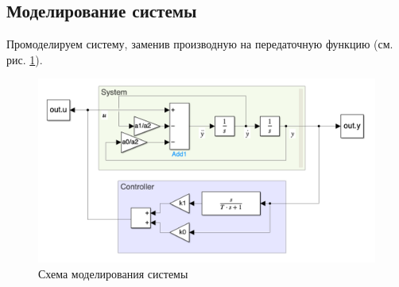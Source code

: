 \subsection{Моделирование системы}
Промоделируем систему, заменив производную на передаточную функцию (см. рис. \ref{fig:task2_scheme}).
\begin{figure}[ht!]
    \centering
    \includegraphics[width=\textwidth]{"media/scheme2.png"}
    \caption{Схема моделирования системы}
    \label{fig:task2_scheme}
\end{figure}


